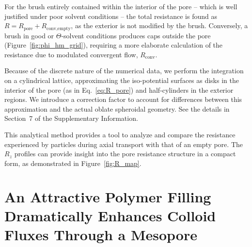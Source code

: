 \documentclass[12pt, a4paper]{article}
\begin{document}
For the brush entirely contained within the interior of the pore -- which is well justified under poor solvent conditions -- the total resistance is found as $R = R_{\textrm{pore}} + R_{\textrm{conv,empty}}$, as the exterior is not modified by the brush.
Conversely, a brush in good or $\Theta$-solvent conditions produces caps outside the pore (Figure~\ref{fig:phi_hm_grid}), requiring a more elaborate calculation of the resistance due to modulated convergent flow, $R_{\textrm{conv}}$.

Because of the discrete nature of the numerical data, we perform the integration on a cylindrical lattice, approximating the iso-potential surfaces as disks in the interior of the pore (as in Eq.~\ref{eq:R_pore}) and half-cylinders in the exterior regions.
We introduce a correction factor to account for differences between this approximation and the actual oblate spheroidal geometry.
See the details in Section~7 of the Supplementary Information.

This analytical method provides a tool to analyze and compare the resistance experienced by particles during axial transport with that of an empty pore.
The $R_z$ profiles can provide insight into the pore resistance structure in a compact form, as demonstrated in Figure~\ref{fig:R_map}.


\section{An Attractive Polymer Filling Dramatically Enhances Colloid Fluxes Through a Mesopore}
\end{document}
